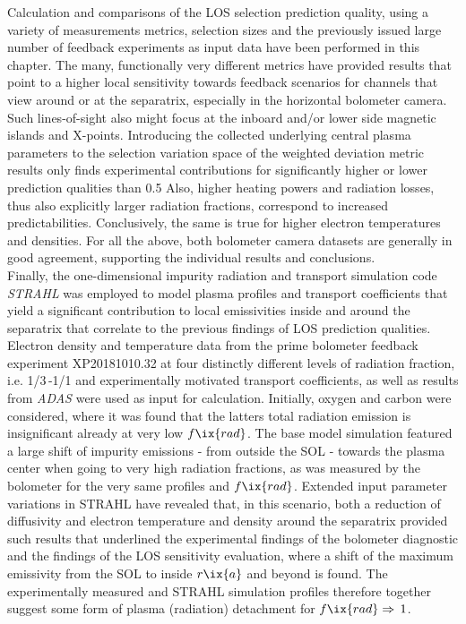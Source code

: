         Calculation and comparisons of the LOS selection prediction quality, using a variety of measurements metrics, selection sizes and the previously issued large number of feedback experiments as input data have been performed in this chapter. The many, functionally very different metrics have provided results that point to a higher local sensitivity towards feedback scenarios for channels that view around or at the separatrix, especially in the horizontal bolometer camera. Such lines-of-sight also might focus at the inboard and/or lower side magnetic islands and X-points. Introducing the collected underlying central plasma parameters to the selection variation space of the weighted deviation metric results only finds experimental contributions for significantly higher or lower prediction qualities than \SI{0.5}{\arbitraryunit} Also, higher heating powers and radiation losses, thus also explicitly larger radiation fractions, correspond to increased predictabilities. Conclusively, the same is true for higher electron temperatures and densities. For all the above, both bolometer camera datasets are generally in good agreement, supporting the individual results and conclusions.\\%
        Finally, the one-dimensional impurity radiation and transport simulation code \textit{STRAHL} was employed to model plasma profiles and transport coefficients that yield a significant contribution to local emissivities inside and around the separatrix that correlate to the previous findings of LOS prediction qualities. Electron density and temperature data from the prime bolometer feedback experiment XP20181010.32 at four distinctly different levels of radiation fraction, i.e. 1/3\,-1/1 and experimentally motivated transport coefficients, as well as results from \textit{ADAS} were used as input for calculation. Initially, oxygen and carbon were considered, where it was found that the latters total radiation emission is insignificant already at very low $f\ix{rad}$. The base model simulation featured a large shift of impurity emissions - from outside the SOL - towards the plasma center when going to very high radiation fractions, as was measured by the bolometer for the very same profiles and $f\ix{rad}$. Extended input parameter variations in STRAHL have revealed that, in this scenario, both a reduction of diffusivity and electron temperature and density around the separatrix provided such results that underlined the experimental findings of the bolometer diagnostic and the findings of the LOS sensitivity evaluation, where a shift of the maximum emissivity from the SOL to inside $r\ix{a}$ and beyond is found. The experimentally measured and STRAHL simulation profiles therefore together suggest some form of plasma (radiation) detachment for $f\ix{rad}\Rightarrow\,1$.\\%
